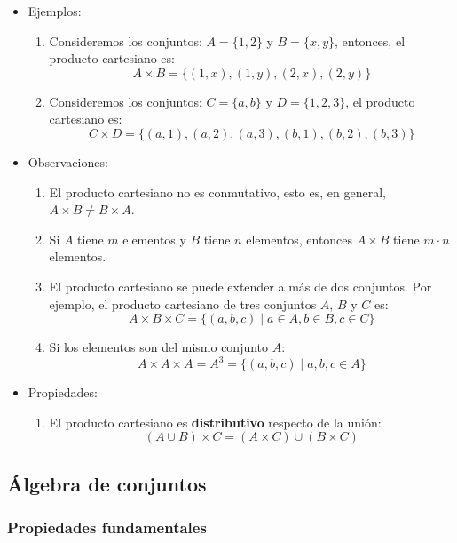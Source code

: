 \begin{itemize}
	\item Ejemplos:
	
	\begin{enumerate}
		\item Consideremos los conjuntos: \(A = \{1, 2\}\) y \(B = \{x, y\}\), entonces, el producto cartesiano es:
		$$A \times B = \{(1, x), (1, y), (2, x), (2, y)\}$$
		
		\item Consideremos los conjuntos: \(C = \{a, b\}\) y \(D = \{1, 2, 3\}\), el producto cartesiano es:
		$$C \times D = \{(a, 1), (a, 2), (a, 3), (b, 1), (b, 2), (b, 3)\}$$
	\end{enumerate}
	
	\item Observaciones:
	
	\begin{enumerate}
		\item El producto cartesiano no es conmutativo, esto es, en general, \(A \times B \neq B \times A\).
		\item Si \(A\) tiene \(m\) elementos y \(B\) tiene \(n\) elementos, entonces \(A \times B\) tiene \(m \cdot n\) elementos.
		\item El producto cartesiano se puede extender a más de dos conjuntos. Por ejemplo, el producto cartesiano de tres conjuntos \(A\), \(B\) y \(C\) es:
		$$A \times B \times C = \{(a, b, c) \mid a \in A, b \in B, c \in C\}$$
		\item Si los elementos son del mismo conjunto $A$:
		\[ A \times A \times A = A^3 = \{(a, b, c) \mid a, b, c \in A\} \]
	\end{enumerate}
	
	\item Propiedades:
	\begin{enumerate}[label=\roman*)]
		\item El producto cartesiano es \textbf{distributivo} respecto de la unión:
		\[ \left( A \cup B \right) \times C = \left( A \times C \right) \cup \left( B \times C \right) \]
	\end{enumerate}
	
\end{itemize}


\subsection{Álgebra de conjuntos} \label{sec:algebra_conjuntos}
\subsubsection{Propiedades fundamentales}

